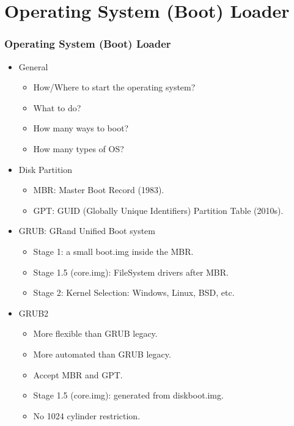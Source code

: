 \documentclass[aspectratio=169, xcolor=table, notheorems, hyperref={pdfpagelabels=false}]{beamer}
\begin{document}
\section{Operating System (Boot) Loader}
\begin{frame}
\frametitle{Operating System (Boot) Loader}
\begin{itemize}
\item General
\begin{itemize}
\item How/Where to start the operating system?
\item What to do?
\item How many ways to boot?
\item How many types of OS?
\end{itemize}
\item Disk Partition
\begin{itemize}
\item MBR: Master Boot Record (1983).
\item GPT: GUID (Globally Unique Identifiers) Partition Table (2010s).
\end{itemize}
\item GRUB: GRand Unified Boot system
\begin{itemize}
\item Stage 1: a small boot.img inside the MBR.
\item Stage 1.5 (core.img): FileSystem drivers after MBR.
\item Stage 2: Kernel Selection: Windows, Linux, BSD, etc. 
\end{itemize}
\item GRUB2
\begin{itemize}
\item More flexible than GRUB legacy.
\item More automated than GRUB legacy.
\item Accept MBR and GPT.
\item Stage 1.5 (core.img): generated from diskboot.img.
\item No 1024 cylinder restriction.
\end{itemize}
\end{itemize}
\end{frame}

\end{document}
